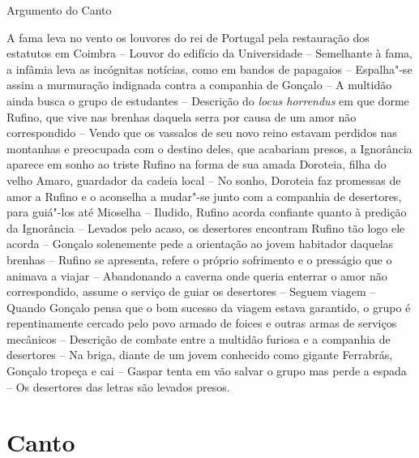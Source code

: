 \mbox{}\vfill
\thispagestyle{empty}
\noindent Argumento do Canto 
\medskip


{\footnotesize\noindent A fama leva no vento os louvores do rei de Portugal pela restauração dos
estatutos em Coimbra -- Louvor do edifício da Universidade -- Semelhante
à fama, a infâmia leva as incógnitas notícias, como em bandos de papagaios
-- Espalha"-se assim a murmuração indignada contra a companhia de Gonçalo --
A multidão ainda busca o grupo de estudantes -- Descrição do \textit{locus
horrendus} em que dorme Rufino, que vive nas brenhas daquela serra por causa
de um amor não correspondido -- Vendo que os vassalos de seu novo reino
estavam perdidos nas montanhas e preocupada com o destino deles, que acabariam
presos, a Ignorância aparece em sonho ao triste Rufino na forma de sua amada
Doroteia, filha do velho Amaro, guardador da cadeia local -- No sonho,
Doroteia faz promessas de amor a Rufino e o aconselha a mudar"-se junto com
a companhia de desertores, para guiá"-los até Mioselha -- Iludido, Rufino
acorda confiante quanto à predição da Ignorância -- Levados pelo acaso,
os desertores encontram Rufino tão logo ele acorda -- Gonçalo solenemente
pede a orientação ao jovem habitador daquelas brenhas -- Rufino se apresenta,
refere o próprio sofrimento e o presságio que o animava a viajar -- Abandonando
a caverna onde queria enterrar o amor não correspondido, assume o serviço de
guiar os desertores --  Seguem viagem -- Quando Gonçalo pensa que o bom sucesso 
da viagem estava garantido, o grupo é repentinamente cercado pelo povo armado
de foices e outras armas de serviços mecânicos -- Descrição de combate entre
a multidão furiosa e a companhia de desertores -- Na briga, diante de um jovem
conhecido como gigante Ferrabrás, Gonçalo tropeça e cai -- Gaspar tenta em vão
salvar o grupo mas perde a espada -- Os desertores das letras são levados presos.} \enlargethispage{\baselineskip}


\chapter{Canto }


